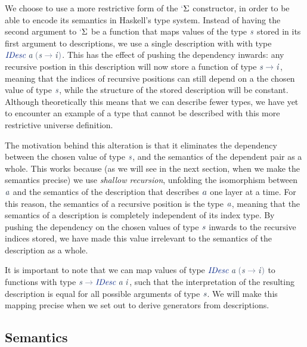 \documentclass[a4paper,msc,twosized=semi]{uustthesis}
\let\oldemph\emph
\renewcommand\emph[1]{{\large\oldemph{#1}}}
\newcommand*{\mathcolor}{}
\def\mathcolor#1#{\mathcoloraux{#1}}
\newcommand*{\mathcoloraux}[3]{%
  \protect\leavevmode
  \begingroup
    \color#1{#2}#3%
  \endgroup
}
\newcommand{\HSSpecial}[1]{\mathcolor{hsblue4}{#1}}
\newcommand{\HSSym}[1]{\mathcolor{hsblue4}{#1}}
\newcommand{\HSCon}[1]{\mathcolor{hsblue3}{\mathit{#1}}}
\newcommand{\HSVar}[1]{\mathcolor{hsblue5}{\mathit{#1}}}
\begin{document}
  We choose to use a more restrictive form of the \ensuremath{\HSSpecial{`}\Sigma } constructor, in order to be 
  able to encode its semantics in Haskell's type system. 
  Instead of having the second argument to \ensuremath{\HSSpecial{`}\Sigma } be a function that maps values of 
  the type \ensuremath{\HSVar{s}} stored in its first argument to descriptions, we use a single 
  description with with type \ensuremath{\HSCon{IDesc}\;\HSVar{a}\;\HSSpecial{(}\HSVar{s}\HSSym{\to} \HSVar{i}\HSSpecial{)}}. This has the effect of pushing the 
  dependency inwards: any recursive postion in this description will now store a 
  function of type \ensuremath{\HSVar{s}\HSSym{\to} \HSVar{i}}, meaning that the indices of recursive positions can still 
  depend on a the chosen value of type \ensuremath{\HSVar{s}}, while the structure of the stored 
  description will be constant. Although theoretically this means that we can describe 
  fewer types, we have yet to encounter an example of a type that cannot be described 
  with this more restrictive universe definition. 
  
  The motivation behind this alteration is that it eliminates the dependency between 
  the chosen value of type \ensuremath{\HSVar{s}}, and the semantics of the dependent pair as a whole. 
  This works because (as we will see in the next section, when we make the semantics 
  precise) we use \emph{shallow recursion}, unfolding the isomorphism between \ensuremath{\HSVar{a}} and 
  the semantics of the description that describes \ensuremath{\HSVar{a}} one layer at a time. For this 
  reason, the semantics of a recursive position is the type \ensuremath{\HSVar{a}}, meaning that the 
  semantics of a description is completely independent of its index type. By pushing 
  the dependency on the chosen values of type \ensuremath{\HSVar{s}} inwards to the recursive indices 
  stored, we have made this value irrelevant to the semantics of the description as a 
  whole. 
  
  It is important to note that we can map values of type \ensuremath{\HSCon{IDesc}\;\HSVar{a}\;\HSSpecial{(}\HSVar{s}\HSSym{\to} \HSVar{i}\HSSpecial{)}} to 
  functions with type \ensuremath{\HSVar{s}\HSSym{\to} \HSCon{IDesc}\;\HSVar{a}\;\HSVar{i}}, such that the interpretation of the resulting 
  description is equal for all possible arguments of type \ensuremath{\HSVar{s}}. We will make this 
  mapping precise when we set out to derive generators from descriptions. 

\subsection{Semantics}
\end{document}
